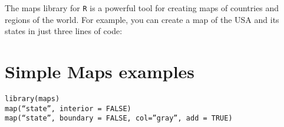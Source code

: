 \documentclass[12pt]{report}
\begin{document}
\noindent The maps library for \texttt{R} is a powerful tool for creating maps of countries and regions of the world. For example, you can create a map of the USA and its states in just three lines of code:
\section*{Simple Maps examples}
\begin{framed}
\begin{verbatim}
library(maps)
map(“state”, interior = FALSE)
map(“state”, boundary = FALSE, col=”gray”, add = TRUE)
\end{verbatim}
\end{framed}
\end{document}
